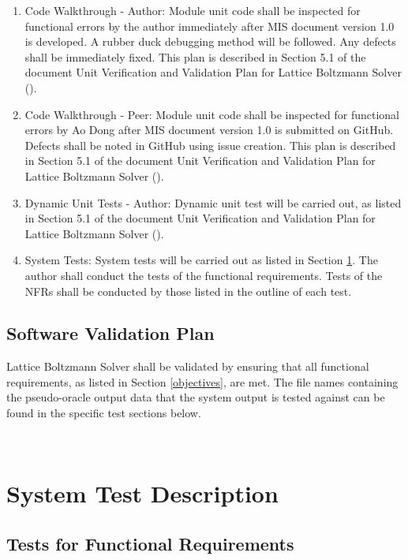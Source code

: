 \documentclass[12pt, titlepage]{article}
\newcommand{\famname}{Lattice Boltzmann Solver}
\begin{document}
\begin{enumerate}
\item Code Walkthrough - Author: Module unit code shall be inspected for
  functional errors by the author immediately after MIS document version 1.0 is
  developed. A rubber duck debugging method will be followed. Any defects shall
  be immediately fixed. This plan is described in Section 5.1 of the document
  Unit Verification and Validation Plan for Lattice Boltzmann Solver
  (\citet{LBM_UVNV_PM}).
\item Code Walkthrough - Peer: Module unit code shall be inspected for
  functional errors by Ao Dong after MIS document version 1.0 is submitted on
  GitHub. Defects shall be noted in GitHub using issue creation. This plan is
  described in Section 5.1 of the document Unit Verification and Validation Plan
  for Lattice Boltzmann Solver (\citet{LBM_UVNV_PM}).
\item Dynamic Unit Tests - Author: Dynamic unit test will be carried out, as
  listed in Section 5.1 of the document Unit Verification and Validation Plan
  for Lattice Boltzmann Solver (\citet{LBM_UVNV_PM}).
\item System Tests: System tests will be carried out as listed in Section
  \ref{systest}. The author shall conduct the tests of the functional
  requirements. Tests of the NFRs shall be conducted by those listed in the
  outline of each test.
\end{enumerate}

\subsection{Software Validation Plan}

{\famname} shall be validated by ensuring that all functional requirements, as
listed in Section \ref{objectives}, are met. The file names containing the
pseudo-oracle output data that the system output is tested against can be found
in the specific test sections below.

~\newpage	 

\section{System Test Description} \label{systest}

\subsection{Tests for Functional Requirements}
\end{document}
